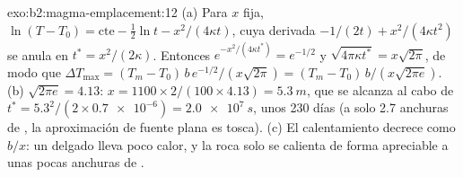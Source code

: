 \begin{solution}{exo:b2:magma-emplacement:12}
(a) Para $x$ fija, $\ln(T - T_0) = \text{cte} - \frac12\ln t - x^2/(4\kappa t)$, cuya
derivada $-1/(2t) + x^2/(4\kappa t^2)$ se anula en $t^* = x^2/(2\kappa)$. Entonces
$e^{-x^2/(4\kappa t^*)} = e^{-1/2}$ y $\sqrt{4\pi\kappa t^*} = x\sqrt{2\pi}$, de modo que $\Delta
T_{\max} = (T_m - T_0)\,b\,e^{-1/2}/(x\sqrt{2\pi}) = (T_m - T_0)\,b/(x\sqrt{2\pi e})$. (b)
$\sqrt{2\pi e} = 4.13$: $x = 1100\times2/(100\times4.13) = \qty{5.3}{m}$, que se alcanza al cabo de
$t^* = 5.3^2/(2\times\num{0.7e-6}) = \qty{2.0e7}{s}$, unos 230 días (a solo 2.7
anchuras de , la aproximación de fuente plana es tosca). (c) El calentamiento decrece
como $b/x$: un  delgado lleva poco calor, y la roca solo se calienta de forma apreciable
a unas pocas anchuras de .
\end{solution}

